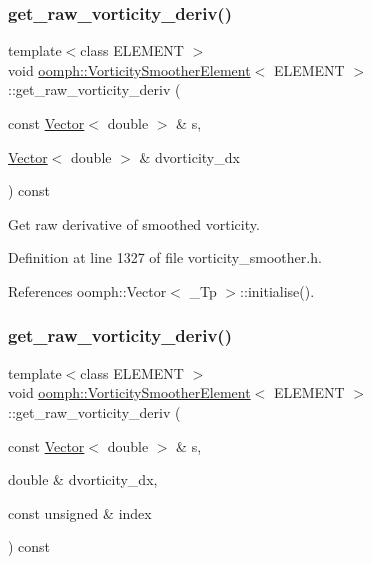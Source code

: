 \subsubsection{\texorpdfstring{get\+\_\+raw\+\_\+vorticity\+\_\+deriv()}{get\_raw\_vorticity\_deriv()}\hspace{0.1cm}{\footnotesize\ttfamily [1/2]}}
{\footnotesize\ttfamily template$<$class E\+L\+E\+M\+E\+NT $>$ \\
void \hyperlink{classoomph_1_1VorticitySmootherElement}{oomph\+::\+Vorticity\+Smoother\+Element}$<$ E\+L\+E\+M\+E\+NT $>$\+::get\+\_\+raw\+\_\+vorticity\+\_\+deriv (\begin{DoxyParamCaption}\item[{const \hyperlink{classoomph_1_1Vector}{Vector}$<$ double $>$ \&}]{s,  }\item[{\hyperlink{classoomph_1_1Vector}{Vector}$<$ double $>$ \&}]{dvorticity\+\_\+dx }\end{DoxyParamCaption}) const\hspace{0.3cm}{\ttfamily [inline]}}



Get raw derivative of smoothed vorticity. 



Definition at line 1327 of file vorticity\+\_\+smoother.\+h.



References oomph\+::\+Vector$<$ \+\_\+\+Tp $>$\+::initialise().

\mbox{\label{classoomph_1_1VorticitySmootherElement_ab070bf8233fe89a359e3c93a4ab1708c}} 
\subsubsection{\texorpdfstring{get\+\_\+raw\+\_\+vorticity\+\_\+deriv()}{get\_raw\_vorticity\_deriv()}\hspace{0.1cm}{\footnotesize\ttfamily [2/2]}}
{\footnotesize\ttfamily template$<$class E\+L\+E\+M\+E\+NT $>$ \\
void \hyperlink{classoomph_1_1VorticitySmootherElement}{oomph\+::\+Vorticity\+Smoother\+Element}$<$ E\+L\+E\+M\+E\+NT $>$\+::get\+\_\+raw\+\_\+vorticity\+\_\+deriv (\begin{DoxyParamCaption}\item[{const \hyperlink{classoomph_1_1Vector}{Vector}$<$ double $>$ \&}]{s,  }\item[{double \&}]{dvorticity\+\_\+dx,  }\item[{const unsigned \&}]{index }\end{DoxyParamCaption}) const\hspace{0.3cm}{\ttfamily [inline]}}



